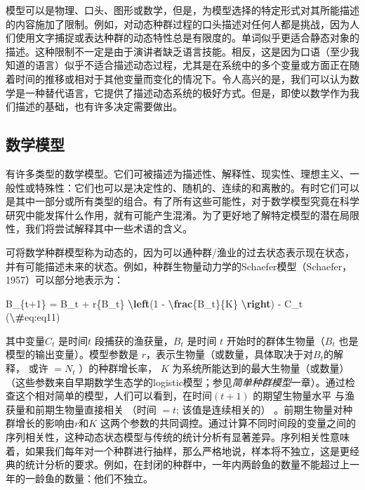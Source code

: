 \documentclass[
  lang=cn,
  11pt,
  scheme=chinese,
  chinesefont=nofont,
  citestyle=gb7714-2015,
  bibstyle=gb7714-2015]{elegantbook}
\newenvironment{Shaded}{\begin{snugshade}}{\end{snugshade}}
\newcommand{\FunctionTok}[1]{\textcolor[rgb]{0.13,0.29,0.53}{\textbf{#1}}}
\newcommand{\NormalTok}[1]{#1}
\begin{document}
模型可以是物理、口头、图形或数学，但是，为模型选择的特定形式对其所能描述的内容施加了限制。例如，对动态种群过程的口头描述对任何人都是挑战，因为人们使用文字捕捉或表达种群的动态特性总是有限度的。单词似乎更适合静态对象的描述。这种限制不一定是由于演讲者缺乏语言技能。相反，这是因为口语（至少我知道的语言）似乎不适合描述动态过程，尤其是在系统中的多个变量或方面正在随着时间的推移或相对于其他变量而变化的情况下。令人高兴的是，我们可以认为数学是一种替代语言，它提供了描述动态系统的极好方式。但是，即使以数学作为我们描述的基础，也有许多决定需要做出。

\subsection{数学模型}\label{ux6570ux5b66ux6a21ux578b}

有许多类型的数学模型。它们可被描述为描述性、解释性、现实性、理想主义、一般性或特殊性：它们也可以是决定性的、随机的、连续的和离散的。有时它们可以是其中一部分或所有类型的组合。有了所有这些可能性，对于数学模型究竟在科学研究中能发挥什么作用，就有可能产生混淆。为了更好地了解特定模型的潜在局限性，我们将尝试解释其中一些术语的含义。

可将数学种群模型称为动态的，因为可以通种群/渔业的过去状态表示现在状态，并有可能描述未来的状态。例如，种群生物量动力学的Schaefer模型（Schaefer，1957）可以部分地表示为：

\begin{Shaded}
\begin{Highlighting}[]
\NormalTok{B\_\{t+1\} = B\_t + r\{B\_t\} }\FunctionTok{\textbackslash{}left}\NormalTok{(1 {-} }\FunctionTok{\textbackslash{}frac}\NormalTok{\{B\_t\}\{K\} }\FunctionTok{\textbackslash{}right}\NormalTok{) {-} C\_t  }
\NormalTok{(}\FunctionTok{\textbackslash{}\#}\NormalTok{eq:eq11)}
\end{Highlighting}
\end{Shaded}

其中变量\(C_t\) 是时间\(t\) 段捕获的渔获量，\(B_t\) 是时间 \(t\) 开始时的群体生物量（\(B_t\) 也是模型的输出变量）。模型参数是 \(r\)，表示生物量（或数量，具体取决于对\(B_t\)的解释， 或许 \(=N_t\) ）的种群增长率， \(K\) 为系统所能达到的最大生物量（或数量）（这些参数来自早期数学生态学的logistic模型；参见\emph{简单种群模型}一章）。通过检查这个相对简单的模型，人们可以看到，在时间\((t+1)\) 的期望生物量水平 与渔获量和前期生物量直接相关 （时间 \(= t\); 该值是连续相关的） 。前期生物量对种群增长的影响由\(r\)和\(K\) 这两个参数的共同调控。通过计算不同时间段的变量之间的序列相关性，这种动态状态模型与传统的统计分析有显著差异。序列相关性意味着，如果我们每年对一个种群进行抽样，那么严格地说，样本将不独立，这是更经典的统计分析的要求。例如，在封闭的种群中，一年内两龄鱼的数量不能超过上一年的一龄鱼的数量：他们不独立。
\end{document}
